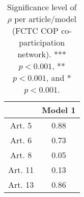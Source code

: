 \begin{table}[ht]
\centering
\begin{tabular}{cc}
  \toprule
 & Model 1 \\ 
  \midrule
Art. 5 & 0.88   \\ 
   \midrule
Art. 6 & 0.73   \\ 
   \midrule
Art. 8 & 0.05   \\ 
   \midrule
Art. 11 & 0.13   \\ 
   \midrule
Art. 13 & 0.86   \\ 
   \bottomrule
\end{tabular}
\caption{Significance level of $\rho$ per article/model (FCTC COP co-participation network). *** $p < 0.001$, ** $p < 0.001$, and * $p < 0.001$.} 
\end{table}
